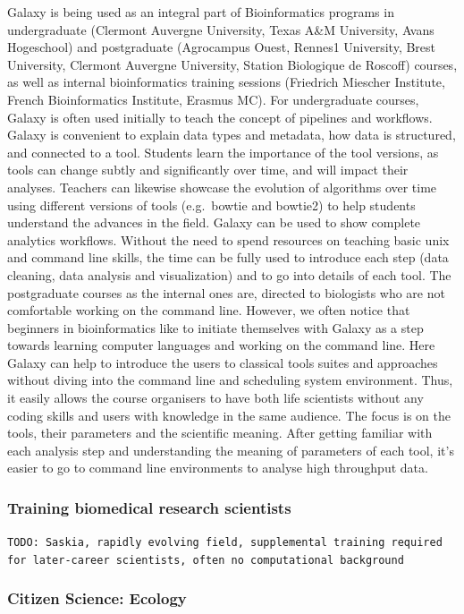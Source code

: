 \documentclass[10pt,letterpaper]{article}
\begin{document}
Galaxy is being used as an integral part of Bioinformatics programs in undergraduate (Clermont Auvergne University, Texas A\&M University, Avans Hogeschool) and postgraduate (Agrocampus Ouest, Rennes1 University, Brest University, Clermont Auvergne University, Station Biologique de Roscoff) courses, as well as internal bioinformatics training sessions (Friedrich Miescher Institute, French Bioinformatics Institute, Erasmus MC).
For undergraduate courses, Galaxy is often used initially to teach the concept of pipelines and workflows.
Galaxy is convenient to explain data types and metadata, how data is structured, and connected to a tool.
Students learn the importance of the tool versions, as tools can change subtly and significantly over time, and will impact their analyses. Teachers can likewise showcase the evolution of algorithms over time using different versions of tools (e.g.\ bowtie and bowtie2) to help students understand the advances in the field. Galaxy can be used to show complete analytics workflows.
Without the need to spend resources on teaching basic unix and command line skills, the time can be fully used to introduce each step (data cleaning, data analysis and visualization) and to go into details of each tool.
The postgraduate courses as the internal ones are, directed to biologists who are not comfortable working on the command line.
However, we often notice that beginners in bioinformatics like to initiate themselves with Galaxy as a step towards learning computer languages and working on the command line.
Here Galaxy can help to introduce the users to classical tools suites and approaches without diving into the command line and scheduling system environment.
Thus, it easily allows the course organisers to have both life scientists without any coding skills and users with knowledge in the same audience. The focus is on the tools, their parameters and the scientific meaning.
After getting familiar with each analysis step and understanding the meaning of parameters of each tool, it’s easier to go to command line environments to analyse high throughput data.


\subsubsection*{Training biomedical research scientists}

\verb+TODO: Saskia, rapidly evolving field, supplemental training required for later-career scientists, often no computational background+

\subsubsection*{Citizen Science: Ecology}
\end{document}
